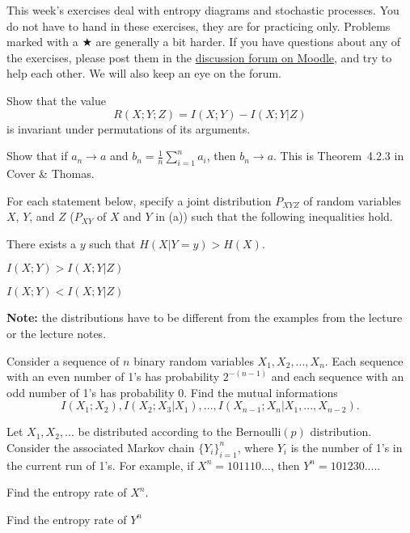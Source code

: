 \documentclass[a4paper,10pt,landscape,twocolumn]{scrartcl}
\begin{document}
\practiceproblems

{\sffamily\noindent
This week's exercises deal with entropy diagrams and stochastic processes. You do not have to hand in these exercises, they are for practicing only. Problems marked with a $\bigstar$ are generally a bit harder. If you have questions about any of the exercises, please post them in the \href{https://www.moodle.ch/lms/mod/forum/view.php?id=1761}{discussion forum on Moodle}, and try to help each other. We will also keep an eye on the forum.
}

\begin{exercise}
Show that the value
\[
R(X;Y;Z) = I(X;Y) - I(X;Y|Z)
\]
is invariant under permutations of its arguments.
\end{exercise}

\begin{exercise}
Show that if $a_n \to a$ and $b_n = \frac{1}{n}\sum_{i=1}^n a_i$, then $b_n \to a$. This is Theorem~4.2.3 in Cover \& Thomas.
\end{exercise}

\begin{exercise}[]
For each statement below, specify a joint distribution $P_{XYZ}$ of random variables $X$, $Y$, and $Z$ ($P_{XY}$ of $X$ and $Y$ in (a)) such that the following inequalities hold.
\begin{subex}
There exists a $y$ such that $H(X|Y=y) > H(X)$.
\end{subex}
\begin{subex}
$I(X;Y) > I(X;Y|Z)$
\end{subex}
\begin{subex}
$I(X;Y) < I(X;Y|Z)$
\end{subex}
\textbf{Note:} the distributions have to be different from the examples from the lecture or the lecture notes.
\end{exercise}

\begin{exercise}
Consider a sequence of $n$ binary random variables $X_1, X_2, ..., X_n$.
Each sequence with an even number of 1's has probability $2^{-(n-1)}$ and each sequence with an odd number
of 1's has probability 0. Find the mutual informations
\[
I(X_1;X_2), I(X_2;X_3|X_1), ..., I(X_{n-1};X_n|X_1, ..., X_{n-2}).
\]
\end{exercise}
\vspace{-0.5cm}
\begin{exercise}
Let $X_1, X_2, ...$ be distributed according to the Bernoulli$(p)$ distribution. Consider the associated Markov chain $\{Y_i\}_{i=1}^n$, where $Y_i$ is the number of 1's in the current run of 1's. For example, if $X^n = 101110...$, then $Y^n = 101230....$.
\begin{subex}
Find the entropy rate of $X^n$.
\end{subex}
\begin{subex}
Find the entropy rate of $Y^n$
\end{subex}
\end{exercise}
\end{document}

